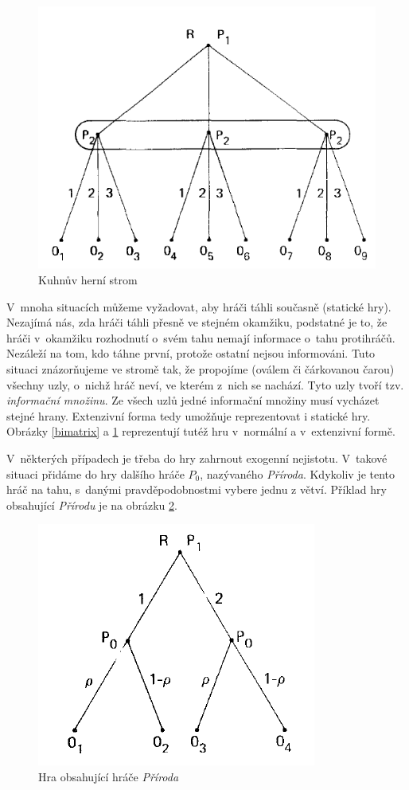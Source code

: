\documentclass[a5paper,12pt]{article}
\begin{document}
    \begin{figure}[htb]
    \centering
    \includegraphics[scale=0.35]{1_1.png}
    \caption{Kuhnův herní strom \label{Kuhn}}
    \end{figure}

    V~mnoha situacích můžeme vyžadovat, aby hráči táhli současně (statické hry). Nezajímá nás, zda hráči táhli přesně ve stejném okamžiku, podstatné je to, že hráči v~okamžiku rozhodnutí o~svém tahu nemají informace o~tahu protihráčů. Nezáleží na tom, kdo táhne první, protože ostatní nejsou informováni. Tuto situaci znázorňujeme ve stromě tak, že propojíme (oválem či čárkovanou čarou) všechny uzly, o~nichž hráč neví, ve kterém z~nich se nachází. Tyto uzly tvoří tzv. \emph{informační množinu}. Ze všech uzlů jedné informační množiny musí vycházet stejné hrany. Extenzivní forma tedy umožňuje reprezentovat i statické hry. Obrázky \ref{bimatrix} a \ref{Kuhn} reprezentují tutéž hru v~normální a v~extenzivní formě.

    V~některých případech je třeba do hry zahrnout exogenní nejistotu. V~takové situaci přidáme do hry dalšího hráče $P_0$, nazývaného \emph{Příroda}. Kdykoliv je tento hráč na tahu, s~danými pravděpodobnostmi vybere jednu z větví. Příklad hry obsahující \emph{Přírodu} je na obrázku \ref{nature}.

    \begin{figure}[htb]
    \centering
    \includegraphics[scale=0.35]{1_2.png}
    \caption{ Hra obsahující hráče \emph{Příroda} \label{nature}}
    \end{figure}
\end{document}
